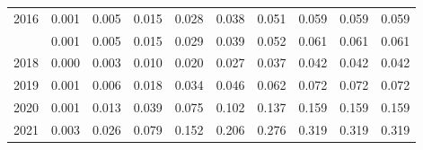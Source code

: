 \documentclass[
]{article}
\begin{document}
\begin{longtable}[t]{lrrrrrrrrr}
2016 & 0.001 & 0.005 & 0.015 & 0.028 & 0.038 & 0.051 & 0.059 & 0.059 & 0.059\\
\addlinespace
2017 & 0.001 & 0.005 & 0.015 & 0.029 & 0.039 & 0.052 & 0.061 & 0.061 & 0.061\\
2018 & 0.000 & 0.003 & 0.010 & 0.020 & 0.027 & 0.037 & 0.042 & 0.042 & 0.042\\
2019 & 0.001 & 0.006 & 0.018 & 0.034 & 0.046 & 0.062 & 0.072 & 0.072 & 0.072\\
2020 & 0.001 & 0.013 & 0.039 & 0.075 & 0.102 & 0.137 & 0.159 & 0.159 & 0.159\\
2021 & 0.003 & 0.026 & 0.079 & 0.152 & 0.206 & 0.276 & 0.319 & 0.319 & 0.319\\*
\end{longtable}
\end{document}

